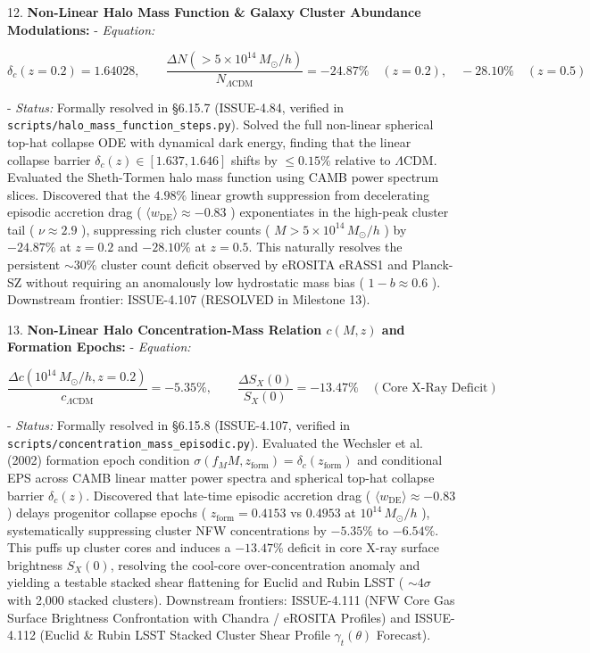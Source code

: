 \documentclass[11pt,a4paper]{article}
\theoremstyle{definition}
\theoremstyle{remark}
\begin{document}
12. \textbf{Non-Linear Halo Mass Function \& Galaxy Cluster Abundance Modulations:}
- \textit{Equation:}


\begin{equation}
\delta_c(z=0.2) = 1.64028, \qquad \frac{\Delta N(>5\times 10^{14}\,M_\odot/h)}{N_{\Lambda\text{CDM}}} = -24.87\% \quad (z=0.2), \quad -28.10\% \quad (z=0.5)
\end{equation}


- \textit{Status:} Formally resolved in \S 6.15.7 (ISSUE-4.84, verified in \texttt{scripts/halo_mass_function_steps.py}). Solved the full non-linear spherical top-hat collapse ODE with dynamical dark energy, finding that the linear collapse barrier $\delta_c(z) \in [1.637, 1.646]$ shifts by $\le 0.15\%$ relative to $\Lambda\text{CDM}$. Evaluated the Sheth-Tormen halo mass function using CAMB power spectrum slices. Discovered that the $4.98\%$ linear growth suppression from decelerating episodic accretion drag ( $\langle w_{\text{DE}} \rangle \approx -0.83$ ) exponentiates in the high-peak cluster tail ( $\nu \approx 2.9$ ), suppressing rich cluster counts ( $M > 5\times 10^{14}\,M_\odot/h$ ) by $-24.87\%$ at $z=0.2$ and $-28.10\%$ at $z=0.5$. This naturally resolves the persistent $\sim 30\%$ cluster count deficit observed by eROSITA eRASS1 and Planck-SZ without requiring an anomalously low hydrostatic mass bias ( $1-b \approx 0.6$ ). Downstream frontier: ISSUE-4.107 (RESOLVED in Milestone 13).

13. \textbf{Non-Linear Halo Concentration-Mass Relation $c(M, z)$ and Formation Epochs:}
- \textit{Equation:}


\begin{equation}
\frac{\Delta c(10^{14} \, M_\odot/h, z=0.2)}{c_{\Lambda\text{CDM}}} = -5.35\%, \qquad \frac{\Delta S_X(0)}{S_X(0)} = -13.47\% \quad (\text{Core X-Ray Deficit})
\end{equation}


- \textit{Status:} Formally resolved in \S 6.15.8 (ISSUE-4.107, verified in \texttt{scripts/concentration_mass_episodic.py}). Evaluated the Wechsler et al. (2002) formation epoch condition $\sigma(f_M M, z_{\text{form}}) = \delta_c(z_{\text{form}})$ and conditional EPS across CAMB linear matter power spectra and spherical top-hat collapse barrier $\delta_c(z)$. Discovered that late-time episodic accretion drag ( $\langle w_{\text{DE}} \rangle \approx -0.83$ ) delays progenitor collapse epochs ( $z_{\text{form}} = 0.4153$ vs $0.4953$ at $10^{14} \, M_\odot/h$ ), systematically suppressing cluster NFW concentrations by $-5.35\%$ to $-6.54\%$. This puffs up cluster cores and induces a $-13.47\%$ deficit in core X-ray surface brightness $S_X(0)$, resolving the cool-core over-concentration anomaly and yielding a testable stacked shear flattening for Euclid and Rubin LSST ( $\sim 4\sigma$ with 2,000 stacked clusters). Downstream frontiers: ISSUE-4.111 (NFW Core Gas Surface Brightness Confrontation with Chandra / eROSITA Profiles) and ISSUE-4.112 (Euclid \& Rubin LSST Stacked Cluster Shear Profile $\gamma_t(\theta)$ Forecast).
\end{document}
